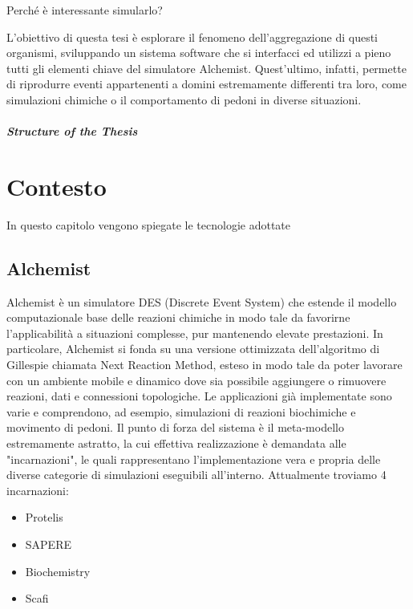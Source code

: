 \documentclass[12pt,a4paper,openright,twoside]{book}
\begin{document}
Perché è interessante simularlo?

L'obiettivo di questa tesi è esplorare il fenomeno dell'aggregazione di questi organismi, sviluppando un sistema software che 
si interfacci ed utilizzi a pieno tutti gli elementi chiave del simulatore Alchemist. Quest'ultimo, infatti, permette di riprodurre eventi appartenenti 
a domini estremamente differenti tra loro, come simulazioni chimiche o il comportamento di pedoni in diverse situazioni.


%
%
%

\paragraph{Structure of the Thesis}


\chapter{Contesto}
In questo capitolo vengono spiegate le tecnologie adottate 

\section{Alchemist}
Alchemist \cite{Pianini_2013} è un simulatore DES (Discrete Event System) che estende il modello computazionale 
base delle reazioni chimiche in modo tale da favorirne l’applicabilità a situazioni complesse,
pur mantenendo elevate prestazioni. In particolare, Alchemist si fonda su una versione ottimizzata 
dell’algoritmo di Gillespie\cite{gillespie1977exact} chiamata Next Reaction Method\cite{gibson2000efficient}, esteso in modo tale da poter lavorare 
con un ambiente mobile e dinamico dove sia possibile aggiungere o rimuovere reazioni, dati e
connessioni topologiche. Le applicazioni già implementate sono varie e comprendono, ad esempio, 
simulazioni di reazioni biochimiche e movimento di pedoni. Il punto di forza del sistema è il 
meta-modello estremamente astratto, la cui effettiva realizzazione è demandata alle "incarnazioni",
le quali rappresentano l’implementazione vera e propria delle diverse categorie di simulazioni 
eseguibili all’interno. Attualmente troviamo 4 incarnazioni: 
\begin{itemize}
    \item Protelis
    \item SAPERE
    \item Biochemistry
    \item Scafi
\end{itemize}
\end{document}
